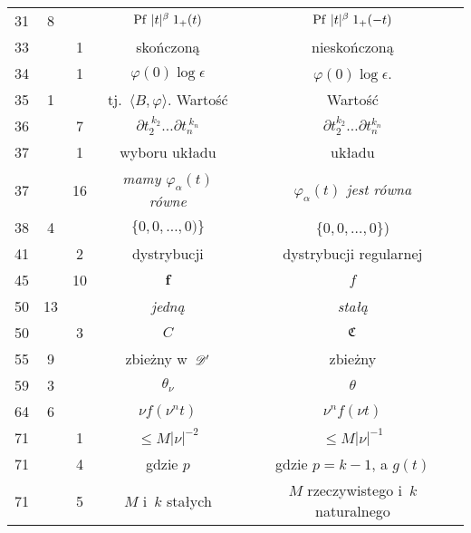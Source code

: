 \documentclass[a4paper,11pt]{article}
\begin{document}
\begin{center}
\begin{tabular}{|c|c|c|c|c|}
    31  &  8 & & $\mathrm{Pf}\, \, | t |^{ \beta } \; 1_{ + }( t )$
           & $\mathrm{Pf}\, \, | t |^{ \beta } \; 1_{ + }( -t )$ \\
    33  & &  1 & skończoną & nieskończoną \\
    34  & &  1 & $\varphi( 0 ) \log \epsilon$ & $\varphi( 0 ) \log \epsilon$. \\
    35 & 1 & & tj.~$\langle B, \varphi \rangle$. Wartość & Wartość \\
    36 & & 7 & $\partial t_{ 2 }^{ \: k_{ 2 } } \ldots \partial t_{ n }^{ \: k_{ n } }$
           & $\partial t_{ 2 }^{ k_{ 2 } } \ldots \partial t_{ n }^{ k_{ n } }$ \\
    37 & & 1 & wyboru układu & układu \\
    37 & & 16 & \textit{mamy $\varphi_{ \alpha }( t )$ równe}
           & \textit{$\varphi_{ \alpha }( t )$ jest równa} \\
    38  &  4 & & $\{ 0, 0, \ldots, 0 ) \}$ & $\{ 0, 0, \ldots, 0 \}$) \\
    41  & &  2 & dystrybucji & dystrybucji regularnej \\
    45  & & 10 & $\boldsymbol{f}$ & $f$ \\
    50  & 13 & & \textit{jedną} & \textit{stałą} \\
    50  & &  3 & $C$ & $\mathfrak{C}$ \\
    55  &  9 & & zbieżny w~$\mathcal{D}'$ & zbieżny \\
    59  &  3 & & $\theta_{ \nu }$ & $\theta$ \\
    64  &  6 & & $\nu f( \nu^{ n } t )$ & $\nu^{ n } f( \nu t )$ \\
    71 & & 1 & $\leq M | \nu |^{ -2 }$ & $\leq M | \nu |^{ -1 }$ \\
    71 & & 4 & gdzie $p$ & gdzie $p = k - 1$, a $g( t )$ \\
    71 & & 5 & $M$ i~$k$ stałych & $M$ rzeczywistego i~$k$ naturalnego \\
    \hline
  \end{tabular}

\end{center}
\end{document}

